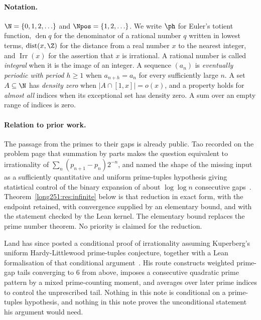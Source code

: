 \paragraph{Notation.}
$\N=\{0,1,2,\ldots\}$ and $\Npos=\{1,2,\ldots\}$.  We write $\ph$ for Euler's
totient function, $\operatorname{den}q$ for the denominator of a rational
number $q$ written in lowest terms, $\operatorname{dist}(x,\Z)$ for the
distance from a real number $x$ to the nearest integer, and
$\operatorname{Irr}(x)$ for the assertion that $x$ is irrational.  A rational
number is called \emph{integral} when it is the image of an integer.  A
sequence $(a_n)$ is \emph{eventually periodic with period $h\ge1$} when
$a_{n+h}=a_n$ for every sufficiently large $n$.  A set $A\subseteq\N$ has
\emph{density zero} when $|A\cap[1,x]|=o(x)$, and a property holds for
\emph{almost all} indices when its exceptional set has density zero.  A sum
over an empty range of indices is zero.

\paragraph{Relation to prior work.}
The passage from the primes to their gaps is already public.  Tao recorded on
the problem page that summation by parts makes the question equivalent to
irrationality of $\sum_n(p_{n+1}-p_n)2^{-n}$, and named the shape of the
missing input as a sufficiently quantitative and uniform prime-tuples
hypothesis giving statistical control of the binary expansion of about
$\log\log n$ consecutive gaps~\cite[comment of 7 October 2025]{erdosproblems251thread}.
Theorem~\ref{long251:res:infinite} below is that reduction in exact form, with the
endpoint retained, with convergence supplied by an elementary bound, and with
the statement checked by the Lean kernel.  The elementary bound replaces the
prime number theorem.  No priority is claimed for the reduction.

Land has since posted a conditional proof of irrationality assuming
Kuperberg's uniform Hardy-Littlewood prime-tuples conjecture, together with a
Lean formalisation of that conditional
argument~\cite[Conjecture~1 and \S1]{land2026}.  His route constructs weighted
prime-gap tails converging to $6$ from above, imposes a consecutive quadratic
prime pattern by a mixed prime-counting moment, and averages over later prime
indices to control the unprescribed tail.  Nothing in this note is
conditional on a prime-tuples hypothesis, and nothing in this note proves the
unconditional statement his argument would need.

